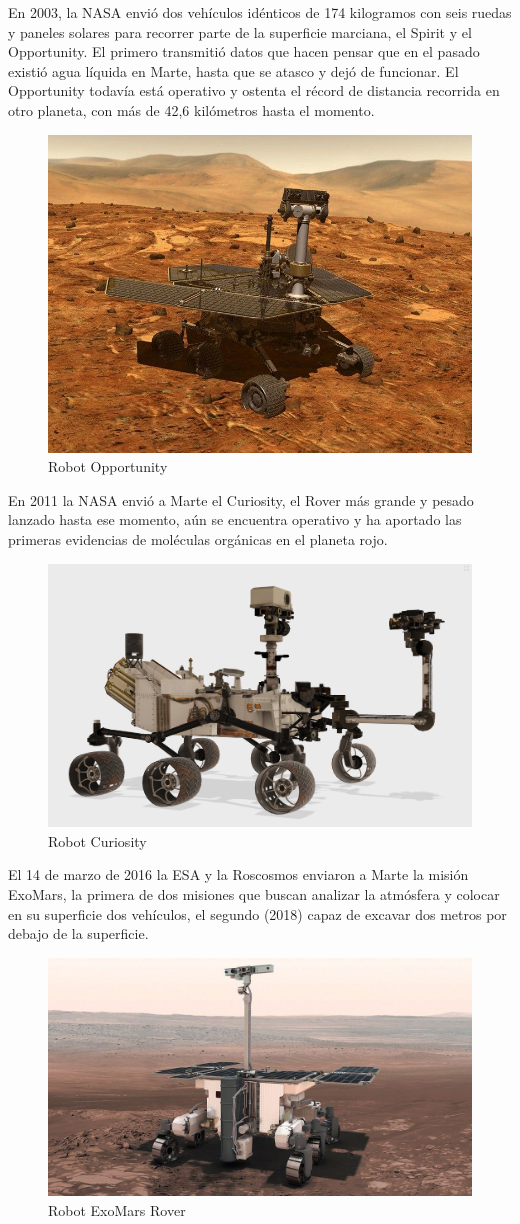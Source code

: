 En 2003, la NASA envió dos vehículos idénticos de 174 kilogramos con seis ruedas y paneles solares para recorrer parte de la superficie marciana, el Spirit y el Opportunity. El primero transmitió datos que hacen pensar que en el pasado existió agua líquida en Marte, hasta que se atasco y dejó de funcionar. El Opportunity todavía está operativo y ostenta el récord de distancia recorrida en otro planeta, con más de 42,6 kilómetros hasta el momento.

\begin{figure}[H]
    \centering
    \includegraphics[width=0.5\linewidth]{images/opportunity-3d-model.jpg}
    \caption{Robot Opportunity}
    \label{fig:robot_opportunity}
\end{figure}

En 2011 la NASA envió a Marte el Curiosity, el Rover más grande y pesado lanzado hasta ese momento, aún se encuentra operativo y ha aportado las primeras evidencias de moléculas orgánicas en el planeta rojo.

\begin{figure}[H]
    \centering
    \includegraphics[width=0.5\linewidth]{images/curiosity-3d-model.jpg}
    \caption{Robot Curiosity}
    \label{fig:robot_curiosity}
\end{figure}

El 14 de marzo de 2016 la ESA y la Roscosmos enviaron a Marte la misión ExoMars, la primera de dos misiones que buscan analizar la atmósfera y colocar en su superficie dos vehículos, el segundo (2018) capaz de excavar dos metros por debajo de la superficie.

\begin{figure}[H]
    \centering
    \includegraphics[width=0.5\linewidth]{images/Exomars_Rover.jpg}
    \caption{Robot ExoMars Rover}
    \label{fig:robot_exomarsrover}
\end{figure}

